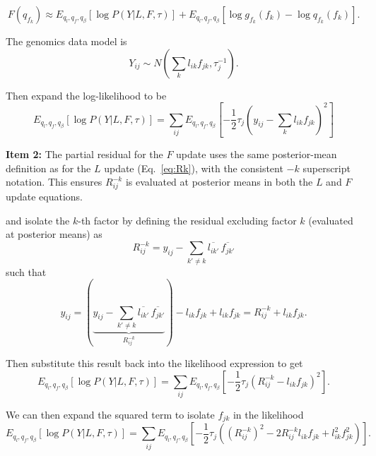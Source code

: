\documentclass{article}[12pt]
\begin{document}
\begin{equation}
    F\left(q_{f_k}\right) \approx E_{q_l, q_f, q_{\beta}}\left[\log P\left(Y \vert L, F, \tau\right)\right] + E_{q_l, q_f, q_{\beta}}\left[\log g_{f_k}(f_k) - \log q_{f_k}(f_k)\right].
\end{equation}

The genomics data model is
\begin{equation}
    Y_{ij} \sim N\left(\sum_{k}l_{ik}f_{jk}, \tau_{j}^{-1}\right).
\end{equation}

Then expand the log-likelihood to be
\begin{equation}
    E_{q_l, q_f, q_{\beta}}\left[\log P\left(Y \vert L, F, \tau\right)\right] = \sum_{ij}E_{q_l, q_f, q_{\beta}}\left[-\frac{1}{2}\tau_{j}\left(y_{ij} - \sum_{k}l_{ik}f_{jk}\right)^2\right]
\end{equation}

\begin{corrbox}
\textbf{Item 2:} The partial residual for the $F$ update uses the same
posterior-mean definition as for the $L$ update (Eq.~\ref{eq:Rk}), with the
consistent $-k$ superscript notation. This ensures $R^{-k}_{ij}$ is evaluated
at posterior means in both the $L$ and $F$ update equations.
\end{corrbox}

\medskip
and isolate the $k$-th factor by defining the residual excluding factor $k$ (evaluated at posterior means) as
\begin{equation}
    R^{-k}_{ij} = y_{ij}-\sum_{k'\neq k}\overline{l_{ik'}}\,\overline{f_{jk'}}
\end{equation}
such that
\begin{equation}
    y_{ij} = \left(\underbrace{y_{ij}-\sum_{k'\neq k}\overline{l_{ik'}}\,\overline{f_{jk'}}}_{R^{-k}_{ij}}\right) - l_{ik}f_{jk} + l_{ik}f_{jk}
    = R^{-k}_{ij} + l_{ik}f_{jk}.
\end{equation}

Then substitute this result back into the likelihood expression to get
\begin{equation}
    E_{q_l, q_f, q_{\beta}}\left[\log P\left(Y \vert L, F, \tau\right)\right] = \sum_{ij}E_{q_l, q_f, q_{\beta}}\left[-\frac{1}{2}\tau_{j}\left(R^{-k}_{ij}-l_{ik}f_{jk}\right)^2\right].
\end{equation}

We can then expand the squared term to isolate $f_{jk}$ in the likelihood
\begin{equation}
    E_{q_l, q_f, q_{\beta}}\left[\log P\left(Y \vert L, F, \tau\right)\right] = \sum_{ij}E_{q_l, q_f, q_{\beta}}\left[-\frac{1}{2}\tau_{j}\left(\left(R^{-k}_{ij}\right)^2-2R^{-k}_{ij}l_{ik}f_{jk}+l^{2}_{ik}f^{2}_{jk}\right)\right].
\end{equation}
\end{document}
